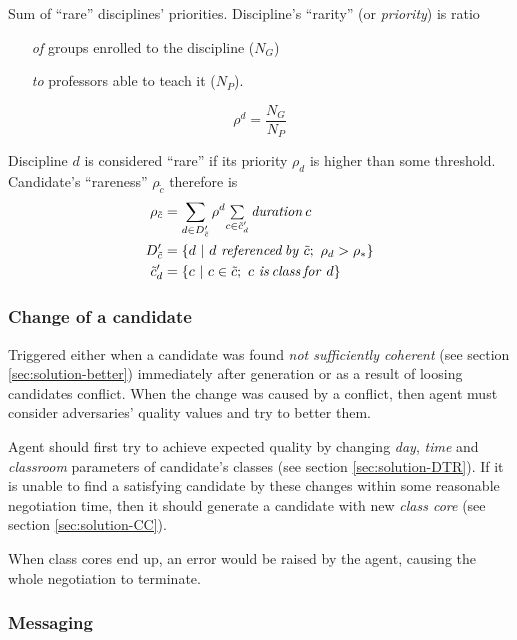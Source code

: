 \documentclass[../../ThesisDoc]{subfiles}
\begin{document}
Sum of ``rare'' disciplines' priorities. Discipline's ``rarity'' (or
\emph{priority}) is ratio
\begin{itemize}
  \item[\textit{of}] groups  enrolled to the discipline ($N_G$)
  \item[\textit{to}] professors able to teach it ($N_P$).
\end{itemize}

$$\rho^d = \dfrac{N_G}{N_P}$$

\medskip
\noindent
Discipline $d$ is considered ``rare'' if its priority $\rho_d$ is higher than
some threshold. \\
\noindent
Candidate's ``rareness'' $\rho_{\tilde{c}}$ therefore is
\begin{align*}
  \rho_{\tilde{c}} &= \sum\limits_{d \in D'_{\tilde{c}}}
        \rho^d \mathsmaller{ \sum\limits_{c \in \tilde{c}'_d}
                              \mathit{duration}\, c }\\
  D'_{\tilde{c}} &= \lbrace d ~|~ d ~\mathit{referenced\,by}~ \tilde{c};~
                                \rho_d > \rho_* \rbrace\\
  \tilde{c}'_d &= \lbrace c ~|~ c \in \tilde{c};~ c ~\mathit{is\,class\,for}~ d \rbrace
\end{align*}


\subsubsection{Change of a candidate}
\label{sec:solution-change}

Triggered either when a candidate was found \emph{not sufficiently coherent}
(see section \ref{sec:solution-better}) immediately after generation
or as a result of loosing candidates conflict.
When the change was caused by a conflict, then agent must consider adversaries'
quality values and try to better them.

Agent should first try to achieve expected quality by changing
\emph{day}, \emph{time} and \emph{classroom} parameters of candidate's classes
(see section \ref{sec:solution-DTR}).
If it is unable to find a satisfying candidate by these changes within some
reasonable negotiation time, then it should generate a candidate with new
\emph{class core} (see section \ref{sec:solution-CC}).

When class cores end up, an error would be raised by the agent, causing the whole
negotiation to terminate.


\subsubsection{Messaging}
\todo
\end{document}
